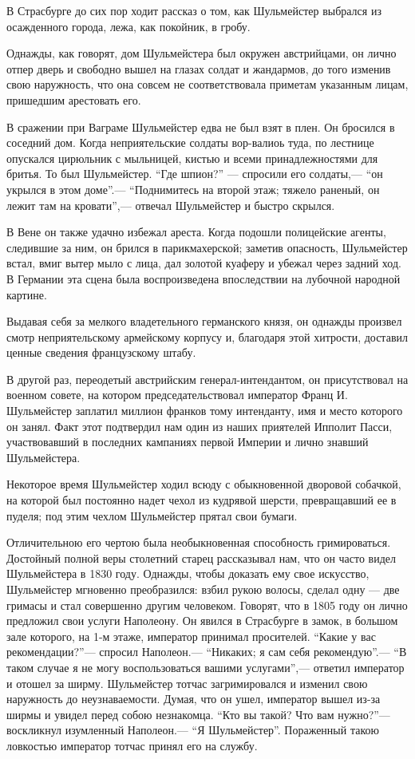 \documentclass[
  oneside,
  12pt,
  titlepage]{book}
\begin{document}
В Страсбурге до сих пор ходит рассказ о том, как Шульмейстер выбрался из осажденного города, лежа, как покойник, в гробу.

Однажды, как говорят, дом Шульмейстера был окружен австрийцами, он лично отпер дверь и свободно вышел на глазах солдат и жандармов, до того изменив свою наружность, что она совсем не соответствовала приметам указанным лицам, пришедшим арестовать его.

В сражении при Ваграме Шульмейстер едва не был взят в плен. Он бросился в соседний дом. Когда неприятельские солдаты вор-валиоь туда, по лестнице опускался цирюльник с мыльницей, кистью и всеми принадлежностями для бритья. То был Шульмейстер. ``Где шпион?'' --- спросили его солдаты,--- ``он укрылся в этом доме''.--- ``Поднимитесь на второй этаж; тяжело раненый, он лежит там на кровати'',--- отвечал Шульмейстер и быстро скрылся.

В Вене он также удачно избежал ареста. Когда подошли полицейские агенты, следившие за ним, он брился в парикмахерской; заметив опасность, Шульмейстер встал, вмиг вытер мыло с лица, дал золотой куаферу и убежал через задний ход. В Германии эта сцена была воспроизведена впоследствии на лубочной народной картине.

Выдавая себя за мелкого владетельного германского князя, он однажды произвел смотр неприятельскому армейскому корпусу и, благодаря этой хитрости, доставил ценные сведения французскому штабу.

В другой раз, переодетый австрийским генерал-интендантом, он присутствовал на военном совете, на котором председательствовал император Франц И. Шульмейстер заплатил миллион франков тому интенданту, имя и место которого он занял. Факт этот подтвердил нам один из наших приятелей Ипполит Пасси, участвовавший в последних кампаниях первой Империи и лично знавший Шульмейстера.

Некоторое время Шульмейстер ходил всюду с обыкновенной дворовой собачкой, на которой был постоянно надет чехол из кудрявой шерсти, превращавший ее в пуделя; под этим чехлом Шульмейстер прятал свои бумаги.

Отличительною его чертою была необыкновенная способность гримироваться. Достойный полной веры столетний старец рассказывал нам, что он часто видел Шульмейстера в 1830 году. Однажды, чтобы доказать ему свое искусство, Шульмейстер мгновенно преобразился: взбил рукою волосы, сделал одну --- две гримасы и стал совершенно другим человеком. Говорят, что в 1805 году он лично предложил свои услуги Наполеону. Он явился в Страсбурге в замок, в большом зале которого, на 1-м этаже, император принимал просителей. ``Какие у вас рекомендации?''--- спросил Наполеон.--- ``Никаких; я сам себя рекомендую''.--- ``В таком случае я не могу воспользоваться вашими услугами'',--- ответил император и отошел за ширму. Шульмейстер тотчас загримировался и изменил свою наружность до неузнаваемости. Думая, что он ушел, император вышел из-за ширмы и увидел перед собою незнакомца. ``Кто вы такой? Что вам нужно?''--- воскликнул изумленный Наполеон.--- ``Я Шульмейстер''. Пораженный такою ловкостью император тотчас принял его на службу.
\end{document}
